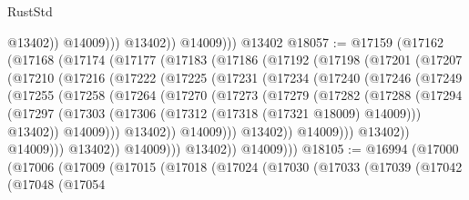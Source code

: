 \begin{lexlean}{RustStd}
\begin{coremodule}
                        @13402))
                    @14009)))
              @13402))
          @14009)))
    @13402
@18057 := @17159
    (@17162
      (@17168
        (@17174
          (@17177
            (@17183
              (@17186
                (@17192
                  (@17198
                    (@17201
                      (@17207
                        (@17210
                          (@17216
                            (@17222
                              (@17225
                                (@17231
                                  (@17234
                                    (@17240
                                      (@17246
                                        (@17249
                                          (@17255
                                            (@17258
                                              (@17264
                                                (@17270
                                                  (@17273
                                                    (@17279
                                                      (@17282
                                                        (@17288
                                                          (@17294
                                                            (@17297
                                                              (@17303
                                                                (@17306
                                                                  (@17312
                                                                    (@17318
                                                                      (@17321 @18009)
                                                                      @14009)))
                                                                @13402))
                                                            @14009)))
                                                      @13402))
                                                  @14009)))
                                            @13402))
                                        @14009)))
                                  @13402))
                              @14009)))
                        @13402))
                    @14009)))
              @13402))
          @14009)))
@18105 := @16994
    (@17000
      (@17006
        (@17009
          (@17015
            (@17018
              (@17024
                (@17030
                  (@17033
                    (@17039
                      (@17042
                        (@17048
                          (@17054

\end{coremodule}
\end{lexlean}
